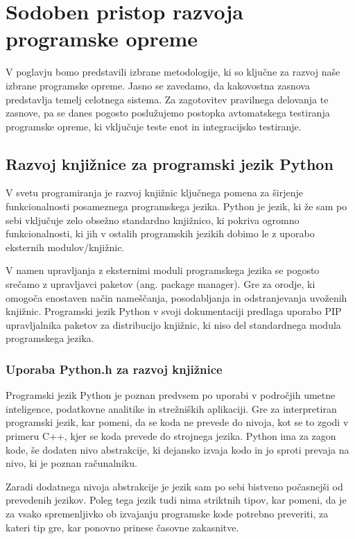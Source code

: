 \documentclass[a4paper,12pt,openright]{book}
\begin{document}
\chapter{Sodoben pristop razvoja programske opreme}
\label{ch1}

    V poglavju bomo predstavili izbrane metodologije, ki so ključne za razvoj naše izbrane programske opreme. Jasno se zavedamo, da kakovostna zasnova predstavlja temelj celotnega sistema. Za zagotovitev pravilnega delovanja te zasnove, pa se danes pogosto poslužujemo postopka avtomatskega testiranja programske opreme, ki vključuje teste enot in integracijsko testiranje.

    \section{Razvoj knjižnice za programski jezik \newline Python}

    V svetu programiranja je razvoj knjižnic ključnega pomena za širjenje funkcionalnosti posameznega programskega jezika. Python je jezik, ki že sam po sebi vključuje zelo obsežno standardno knjižnico, ki pokriva ogromno funkcionalnosti, ki jih v ostalih programskih jezikih dobimo le z uporabo eksternih modulov/knjižnic.

    V namen upravljanja z eksternimi moduli programskega jezika se pogosto srečamo z upravljavci paketov (ang. package manager). Gre za orodje, ki omogoča enostaven način nameščanja, posodabljanja in odstranjevanja uvoženih knjižnic. Programski jezik Python v svoji dokumentaciji \cite{PY_PM} predlaga uporabo PIP \cite{PIP} upravljalnika paketov za distribucijo knjižnic, ki niso del standardnega modula programskega jezika.
   
    \subsection{Uporaba Python.h za razvoj knjižnice}
   Programski jezik Python je poznan predvsem po uporabi v področjih umetne inteligence, podatkovne analitike in strežniških aplikaciji. Gre za interpretiran programski jezik, kar pomeni, da se koda ne prevede do nivoja, kot se to zgodi v primeru C++, kjer se koda prevede do strojnega jezika. Python ima za zagon kode, še dodaten nivo abstrakcije, ki dejansko izvaja kodo in jo sproti prevaja na nivo, ki je poznan računalniku.

   Zaradi dodatnega nivoja abstrakcije je jezik sam po sebi bistveno počasnejši od prevedenih jezikov. Poleg tega jezik tudi nima striktnih tipov, kar pomeni, da je za vsako spremenljivko ob izvajanju programske kode potrebno preveriti, za kateri tip gre, kar ponovno prinese časovne zakasnitve.
\end{document}
